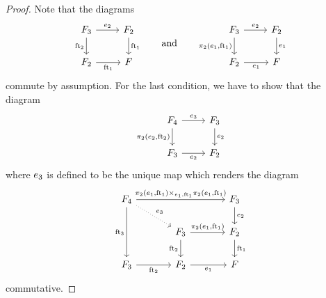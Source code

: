 \begin{proof}
Note that the diagrams
\begin{equation*}
\begin{tikzcd}
\stesysf_3
  \ar{r}{\eext{2}}
  \ar{d}[swap]{\eft[2]}
  &
\stesysf_2
  \ar{d}{\eft[1]}
  \\
\stesysf_2
  \ar{r}[swap]{\eft[1]}
  &
\stesysf
\end{tikzcd}
\qquad\text{and}\qquad
\begin{tikzcd}
\stesysf_3
  \ar{d}[swap]{\pullbackpr{2}{\efamext}{\eft[1]}}
  \ar{r}{\eext{2}}
  & 
\stesysf_2 
  \ar{d}{\efamext} 
  \\
\stesysf_2 
  \ar{r}[swap]{\efamext} 
  &
\stesysf
\end{tikzcd}
\end{equation*}
commute by assumption. For the last condition, we have to show that the
diagram
\begin{equation*}
\begin{tikzcd}
\stesysf_4
  \ar{d}[swap]{\pullbackpr{2}{\eext{2}}{\eft[2]}}
  \ar{r}{\eext{3}}
  & 
\stesysf_3
  \ar{d}{\eext{2}} 
  \\
\stesysf_3
  \ar{r}[swap]{\eext{2}} 
  &
\stesysf_2
\end{tikzcd}
\end{equation*}
where $e_{3}$ is defined to be the unique map which renders the diagram
\begin{equation*}
\begin{tikzcd}[column sep=large]
\stesysf_4
  \ar[dotted]{dr}{\eext{3}}
  \ar{rr}{\pullback{\pullbackpr{2}{\efamext}{\eft[1]}}{\pullbackpr{2}{\efamext}{\eft[1]}}{\efamext}{\eft[1]}}
  \ar{dd}[swap]{\eft[3]}
  & 
  &
\stesysf_3
  \ar{d}{\eext{2}}
  \\
  &
\stesysf_3
  \ar{d}[swap]{\eft[2]}
  \ar{r}{\pullbackpr{2}{\efamext}{\eft[1]}}
  &
\stesysf_2
  \ar{d}{\eft[1]}
  \\
\stesysf_3
  \ar{r}[swap]{\eft[2]}
  &
\stesysf_2
  \ar{r}[swap]{\efamext}
  &
\stesysf
\end{tikzcd}
\end{equation*}
commutative.
\end{proof}

